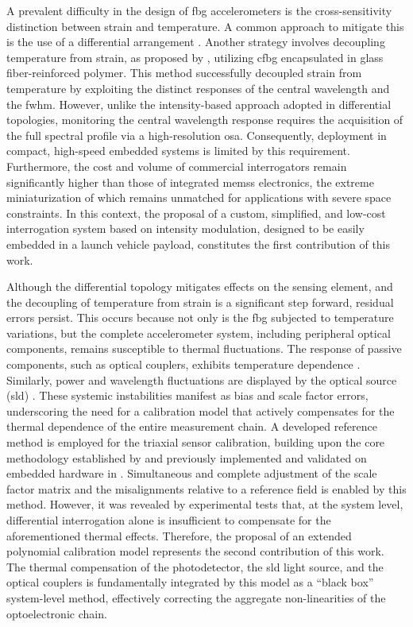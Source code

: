 \documentclass[sensors,article,accept,pdftex,moreauthors]{Definitions/mdpi}
\begin{document}
A prevalent difficulty in the design of \gls{fbg} accelerometers is the cross-sensitivity distinction between strain and temperature. A common approach to mitigate this is the use of a differential arrangement \cite{Morikawa2002,Cazo2008,Masek2011}. Another strategy involves decoupling temperature from strain, as proposed by \citet{Huang2026}, utilizing \gls{cfbg} encapsulated in glass fiber-reinforced polymer. This method successfully decoupled strain from temperature by exploiting the distinct responses of the central wavelength and the \gls{fwhm}. However, unlike the intensity-based approach adopted in differential topologies, monitoring the central wavelength response requires the acquisition of the full spectral profile via a high-resolution \gls{osa}. Consequently, deployment in compact, high-speed embedded systems is limited by this requirement. Furthermore, the cost and volume of commercial interrogators remain significantly higher than those of integrated \glspl{mems} electronics, the extreme miniaturization of which remains unmatched for applications with severe space constraints. In this context, the proposal of a custom, simplified, and low-cost interrogation system based on intensity modulation, designed to be easily embedded in a launch vehicle payload, constitutes the first contribution of this work.


Although the differential topology mitigates effects on the sensing element, and the decoupling of temperature from strain is a significant step forward, residual errors persist. This occurs because not only is the \gls{fbg} subjected to temperature variations, but the complete accelerometer system, including peripheral optical components, remains susceptible to thermal fluctuations. The response of passive components, such as optical couplers, exhibits temperature dependence \citep{Chovan2011,Bednarek2016}. Similarly, power and wavelength fluctuations are displayed by the optical source (\gls{sld}) \citep{Agrawal2002}. These systemic instabilities manifest as bias and scale factor errors, underscoring the need for a calibration model that actively compensates for the thermal dependence of the entire measurement chain. A developed reference method is employed for the triaxial sensor calibration, building upon the core methodology established by \citet{Kuncar2017} and previously implemented and validated on embedded hardware in \citet{Silva2021}. Simultaneous and complete adjustment of the scale factor matrix and the misalignments relative to a reference field is enabled by this method. However, it was revealed by experimental tests that, at the system level, differential interrogation alone is insufficient to compensate for the aforementioned thermal effects. Therefore, the proposal of an extended polynomial calibration model represents the second contribution of this work. The thermal compensation of the photodetector, the \gls{sld} light source, and the optical couplers is fundamentally integrated by this model as a ``black box'' system-level method, effectively correcting the aggregate non-linearities of the optoelectronic chain.
\end{document}

